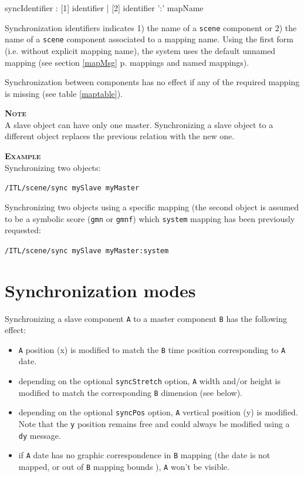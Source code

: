 \documentclass[a4paper,twoside]{report}
\newcommand{\sublevel}[1]	{\section{#1}}
\newcommand{\fullref}[1]	{\ref{#1} p.\pageref{#1}}
\newcommand{\OSC}[1]		{\texttt{#1}}
\newcommand{\values}[1]	{\texttt{#1}}
\newcommand{\example}		{\textbf{\hspace{-1.5cm}\textbf{\textsc{Example }}}}
\newcommand{\note}	[1]		{\vspace{2mm}\textbf{\hspace{-1.03cm}\textbf{\textsc{Note #1}}}}
\newcommand{\sample}	[1]			{\vspace{-2mm}\begin{center}\colorbox{mygrey}{
								\begin{minipage}[t]{0.9\columnwidth} 
								{\small \texttt{#1}}
								\end{minipage}}\end{center}}
\begin{document}
\begin{rail}
syncIdentifier : [1] identifier 
		| [2] identifier ':' mapName
\end{rail}

Synchronization identifiers indicates 1) the name of a \OSC{scene} component or 2) the name of a \OSC{scene} component associated to a mapping name. Using the first form (i.e. without explicit mapping name), the system uses the default unnamed mapping (see section \fullref{mapMsg} mappings and named mappings).

Synchronization between components has no effect if any of the required mapping is missing (see table \ref{maptable}).

\note{} \\
A slave object can have only one master. Synchronizing a slave object to a different object replaces the previous relation with the new one.

\example \\
Synchronizing two objects:
\sample{/ITL/scene/sync mySlave myMaster}

Synchronizing two objects using a specific mapping (the second object is assumed to be a symbolic score (\OSC{gmn} or \OSC{gmnf}) which \OSC{system} mapping has been previously requested:
\sample{/ITL/scene/sync mySlave myMaster:system}

\sublevel{Synchronization modes}\label{syncmode}

Synchronizing a slave component \values{A} to a master component \values{B} has the following effect:
\begin{itemize}
\item \values{A} position (x) is modified to match the \values{B} time position corresponding to \values{A} date.
\item depending on the optional \OSC{syncStretch} option, \values{A} width and/or height is modified to match the  corresponding \values{B} dimension (see below).
\item depending on the optional \OSC{syncPos} option, \values{A} vertical position (y) is modified. Note that the \OSC{y} position remains free and could always be modified using a \OSC{dy} message.
\item if \values{A} date has no graphic correspondence in \values{B} mapping (the date is not mapped, or out of \values{B} mapping bounds ), \values{A} won't be visible.
\end{itemize}
\end{document}
